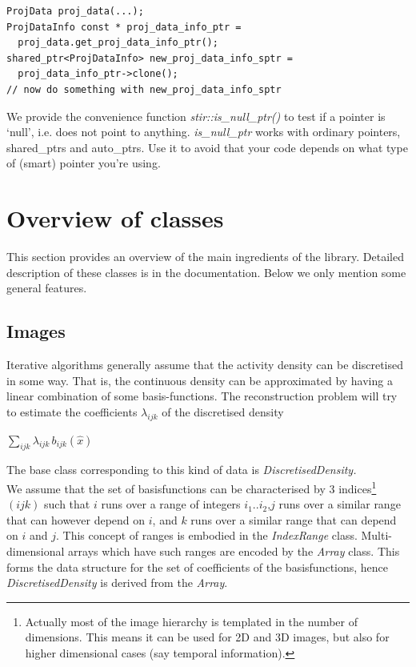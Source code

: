 \documentclass{article}
\begin{document}
\begin{verbatim}
ProjData proj_data(...);
ProjDataInfo const * proj_data_info_ptr = 
  proj_data.get_proj_data_info_ptr();
shared_ptr<ProjDataInfo> new_proj_data_info_sptr = 
  proj_data_info_ptr->clone();
// now do something with new_proj_data_info_sptr
\end{verbatim}


We provide the convenience function \textit{stir::is\_null\_ptr()} 
to test if a pointer is `null', i.e. does not point to anything. \textit{is\_null\_ptr} 
works with ordinary pointers, shared\_ptrs and auto\_ptrs. Use 
it to avoid that your code depends on what type of (smart) pointer 
you're using.

\section{
Overview of classes}

This section provides an overview of the main ingredients of 
the library. Detailed description of these classes is in the documentation. 
Below we only mention some general features.



\subsection{
Images}

Iterative algorithms generally assume that the activity density 
can be discretised in some way. That is, the continuous density 
can be approximated by having a linear combination of some basis-functions. 
The reconstruction problem will try to estimate the coefficients $\lambda_{ijk}$ of 
the discretised density


$\sum_{ ijk}\lambda _{ijk} \,b_{ijk} (\widehat{x})  $

The base class corresponding to this kind of data is \textit{DiscretisedDensity.}\\
We assume that the set of basisfunctions can be characterised 
by 3 indices\footnote{{\small Actually most of the image hierarchy is 
templated in the number of dimensions. This means it can be used 
for 2D and 3D images, but also for higher dimensional cases (say 
temporal information).}} $(ijk)$ such that $i$ runs over a 
range of integers $i_1..i_2$,$j$ runs over a 
similar range that can however depend on $i$, and $k$ runs 
over a similar range that can depend on $i$ and $j$. 
This 
concept of ranges is embodied in the \textit{IndexRange} class. Multi-dimensional 
arrays which have such ranges are encoded by the \textit{Array} class. 
This forms the data structure for the set of coefficients of 
the basisfunctions, hence \textit{DiscretisedDensity} is derived from 
the \textit{Array}.
\end{document}
